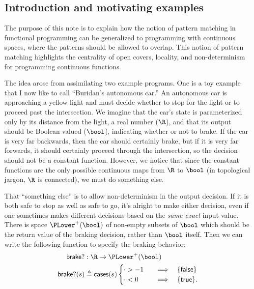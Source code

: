 \subsection{Introduction and motivating examples}

The purpose of this note is to explain how the notion of pattern matching in functional programming can be generalized to programming with continuous spaces, where the patterns should be allowed to overlap. This notion of pattern matching highlights the centrality of open covers, locality, and non-determinism for programming continuous functions.

The idea arose from assimilating two example programs. One is a toy example that I now like to call ``Buridan's autonomous car.'' An autonomous car is approaching a yellow light and must decide whether to stop for the light or to proceed past the intersection. We imagine that the car's state is parameterized only by its distance from the light, a real number ($\R$), and that its output should be Boolean-valued ($\bool$), indicating whether or not to brake. If the car is very far backwards, then the car should certainly brake, but if it is very far forwards, it should certainly proceed through the intersection, so the decision should not be a constant function. However, we notice that since the constant functions are the only possible continuous maps from $\R$ to $\bool$ (in topological jargon, $\R$ is connected), we must do something else.

That ``something else'' is to allow non-determinism in the output decision. If it is both safe to stop as well as safe to go, it's alright to make either decision, even if one sometimes makes different decisions based on the \emph{same exact} input value. There is space $\PLower^+(\bool)$ of non-empty subsets of $\bool$ which should be the return value of the braking decision, rather than $\bool$ itself. Then we can write the following function to specify the braking behavior:
\begin{align*}
\mathsf{brake?} &: \R \to \PLower^+(\bool)
\\ \mathsf{brake?}(s) &\triangleq \mathsf{cases}(s)
\begin{cases}
\cdot > - 1
  \quad &\Longrightarrow \quad
  \{ \mathsf{false} \}
\\
\cdot < 0
  \quad &\Longrightarrow \quad
  \{ \mathsf{true} \}.
\end{cases}
\end{align*}

